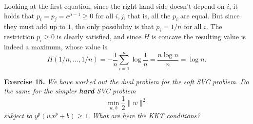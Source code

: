 \documentclass[12pt]{article}
\begin{document}
Looking at the first equation, since the right hand side doesn't depend on $i$, it holds that $p_i=p_j= e^{\mu - 1}\geq 0$ for all $i,j$, that is, all the \( p_i \) are equal. But since they must add up to $1$, the only possibility is that $p_i=1/n$ for all $i$. The restriction $p_i\geq 0$ is clearly satisfied, and since $H$ is concave the resulting value is indeed a maximum, whose value is
\[
H(1/n,\dots, 1/n) = -\frac{1}{n}\sum_{i=1}^n \log{\frac{1}{n}} = \frac{n\log n}{n}=\log n.
\]

\textbf{Exercise 15. }\emph{We have worked out the dual problem for the soft SVC problem. Do the same for the simpler \textbf{hard} SVC problem}
\[
\min_{w,b} \frac{1}{2}\|w\|^2
\]
\emph{subject to \( y^p(wx^p + b) \geq 1 \). What are here the KKT conditions? }
\end{document}

